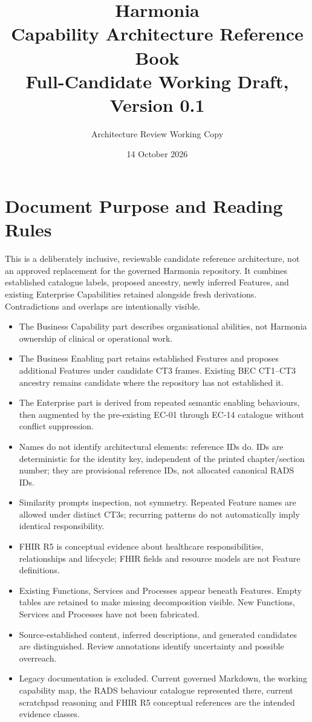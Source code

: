 \documentclass[11pt,a4paper,openany]{book}
\title{Harmonia\\Capability Architecture Reference Book\\\large Full-Candidate Working Draft, Version 0.1}
\author{Architecture Review Working Copy}
\date{14 October 2026}
\begin{document}
\frontmatter\maketitle\tableofcontents
\mainmatter
\chapter*{Document Purpose and Reading Rules}
This is a deliberately inclusive, reviewable candidate reference architecture, not an approved replacement for the governed Harmonia repository. It combines established catalogue labels, proposed ancestry, newly inferred Features, and existing Enterprise Capabilities retained alongside fresh derivations. Contradictions and overlaps are intentionally visible.

\begin{itemize}
\item The Business Capability part describes organisational abilities, not Harmonia ownership of clinical or operational work.
\item The Business Enabling part retains established Features and proposes additional Features under candidate CT3 frames. Existing BEC CT1--CT3 ancestry remains candidate where the repository has not established it.
\item The Enterprise part is derived from repeated semantic enabling behaviours, then augmented by the pre-existing EC-01 through EC-14 catalogue without conflict suppression.
\item Names do not identify architectural elements: reference IDs do. IDs are deterministic for the identity key, independent of the printed chapter/section number; they are provisional reference IDs, not allocated canonical RADS IDs.
\item Similarity prompts inspection, not symmetry. Repeated Feature names are allowed under distinct CT3s; recurring patterns do not automatically imply identical responsibility.
\item FHIR R5 is conceptual evidence about healthcare responsibilities, relationships and lifecycle; FHIR fields and resource models are not Feature definitions.
\item Existing Functions, Services and Processes appear beneath Features. Empty tables are retained to make missing decomposition visible. New Functions, Services and Processes have not been fabricated.
\item Source-established content, inferred descriptions, and generated candidates are distinguished. Review annotations identify uncertainty and possible overreach.
\item Legacy documentation is excluded. Current governed Markdown, the working capability map, the RADS behaviour catalogue represented there, current scratchpad reasoning and FHIR R5 conceptual references are the intended evidence classes.
\end{itemize}
\end{document}
